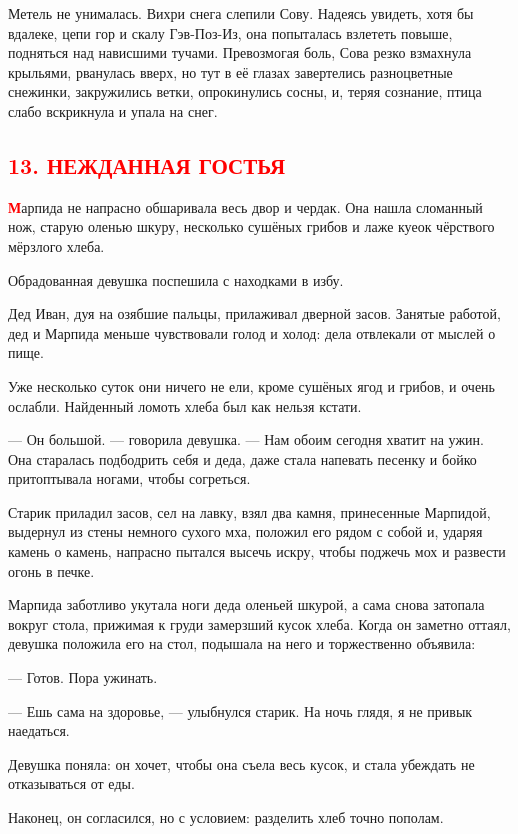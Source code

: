 \documentclass[oneside,final,14pt]{extreport}
\begin{document}
	Метель не унималась. Вихри снега слепили Сову. Надеясь увидеть, хотя бы вдалеке, цепи гор и скалу Гэв-Поз-Из, она попыталась взлететь повыше, подняться над нависшими тучами. Превозмогая боль, Сова резко взмахнула крыльями, рванулась вверх, но тут в её глазах завертелись разноцветные снежинки, закружились ветки, опрокинулись сосны, и, теряя сознание, птица слабо вскрикнула и упала на снег.
	
	
					{%
		\centering
		\subsection*{\textcolor{red}{13. НЕЖДАННАЯ ГОСТЬЯ}}
	}
	
		
	
	\lettrine[findent=0pt]{\textbf{\textcolor{red}{М}}}{}арпида не напрасно обшаривала весь двор и чердак. Она нашла сломанный нож, старую оленью шкуру, несколько сушёных грибов и лаже куеок чёрствого мёрзлого хлеба.
	
	Обрадованная девушка поспешила с находками в избу.
	
	Дед Иван, дуя на озябшие пальцы, прилаживал дверной засов. Занятые работой, дед и Марпида меньше чувствовали голод и холод: дела отвлекали от мыслей о пище.
	
	Уже несколько суток они ничего не ели, кроме сушёных ягод и грибов, и очень ослабли. Найденный ломоть хлеба был как нельзя кстати.
	
	— Он большой. — говорила девушка. — Нам обоим сегодня хватит на ужин. Она старалась подбодрить себя и деда, даже стала напевать песенку и бойко притоптывала ногами, чтобы согреться.
	
	Старик приладил засов, сел на лавку, взял два камня, принесенные Марпидой, выдернул из стены немного сухого мха, положил его рядом с собой и, ударяя камень о камень, напрасно пытался высечь искру, чтобы поджечь мох и развести огонь в печке.
	
	Марпида заботливо укутала ноги деда оленьей шкурой, а сама снова затопала вокруг стола, прижимая к груди замерзший кусок хлеба. Когда он заметно оттаял, девушка положила его на стол, подышала на него и торжественно объявила:
	
	— Готов. Пора ужинать.
	
	— Ешь сама на здоровье, — улыбнулся старик. На ночь глядя, я не привык наедаться.
	
	Девушка поняла: он хочет, чтобы она съела весь кусок, и стала убеждать не отказываться от еды.
	
	Наконец, он согласился, но с условием: разделить хлеб точно пополам.
	
\end{document}
